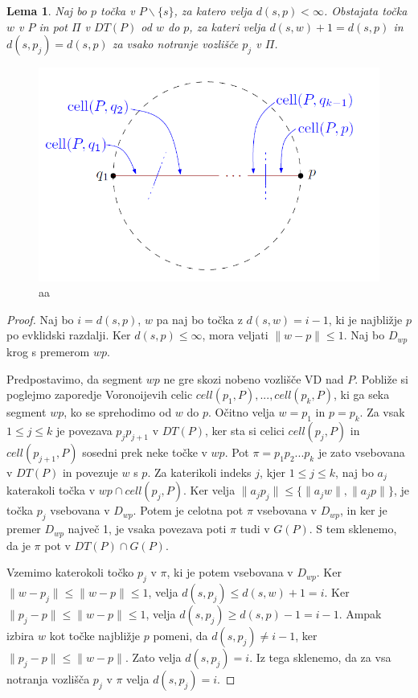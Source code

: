 \documentclass[a4paper, 12pt]{book}
\newtheorem{lema}[izrek]{Lema}
\begin{document}
\begin{lema}
\label{lema1}
Naj bo $p$ točka v $P\backslash \{s\}$, za katero velja $d(s,p) < \infty$. Obstajata točka $w$ v $P$ in pot $\Pi$ v $DT(P)$ od $w$ do $p$, za kateri velja $d(s,w)+1 = d(s,p)$ in $d(s,p_j) = d(s,p)$ za vsako notranje vozlišče $p_j$ v $\Pi$.
\end{lema}

\begin{figure}
\centerline{\includegraphics[scale=0.5]{pics/qp_path_proof.png}}
\caption{aa}
\label{c1c2}
\end{figure}

\begin{proof}
Naj bo $i = d(s,p)$, $w$ pa naj bo točka z $d(s,w) = i - 1$, ki je najbližje $p$ po evklidski razdalji. Ker $d(s,p) \le \infty$, mora veljati $\|w - p\| \leq 1$. Naj bo $D_{wp}$ krog s premerom $wp$.

Predpostavimo, da segment $wp$ ne gre skozi nobeno vozlišče VD nad $P$.  Pobliže si poglejmo zaporedje Voronoijevih celic $cell(p_1, P),..., cell(p_k, P)$, ki ga seka segment $wp$, ko se sprehodimo od $w$ do $p$. Očitno velja $w = p_1$ in $p = p_k$. Za vsak $1 \leq j \le k$ je povezava $p_jp_{j+1}$ v $DT(P)$, ker sta si celici $cell(p_j, P)$ in $cell(p_{j+1}, P)$ sosedni prek neke točke v $wp$. Pot $\pi = p_1p_2...p_k$ je zato vsebovana v $DT(P)$ in povezuje $w$ s $p$. Za katerikoli indeks $j$, kjer $1 \le j \le k$, naj bo $a_j$ katerakoli točka v $wp \cap cell(p_j, P)$. Ker velja $\|a_jp_j\| \leq \{\|a_jw\|, \|a_jp\|\}$, je točka $p_j$ vsebovana v $D_{wp}$. Potem je celotna pot $\pi$ vsebovana v $D_{wp}$, in ker je premer $D_{wp}$ največ 1, je vsaka povezava poti $\pi$ tudi v $G(P)$. S tem sklenemo, da je $\pi$ pot v $DT(P) \cap G(P)$.

Vzemimo katerokoli točko $p_j$ v $\pi$, ki je potem vsebovana v $D_{wp}$. Ker $\|w - p_j\| \leq \|w - p\| \leq 1$, velja $d(s, p_j) \leq d(s, w) + 1 = i$. Ker $\|p_j - p\| \leq \|w - p\| \leq 1$, velja $d(s, p_j) \geq d(s, p) - 1 = i - 1$. Ampak izbira $w$ kot točke najbližje $p$ pomeni, da $d(s, p_j) \neq i - 1$, ker $\|p_j - p\| \le \|w - p\|$. Zato velja $d(s, p_j) = i$. Iz tega sklenemo, da za vsa notranja vozlišča $p_j$ v $\pi$ velja $d(s, p_j) = i$. 
\end{proof}
\end{document}
